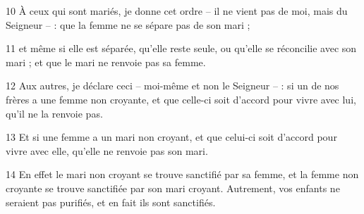 
10 À ceux qui sont mariés, je donne cet ordre – il ne vient pas de moi, mais du Seigneur – : que la femme ne se sépare pas de son mari ;

11 et même si elle est séparée, qu’elle reste seule, ou qu’elle se réconcilie avec son mari ; et que le mari ne renvoie pas sa femme.

12 Aux autres, je déclare ceci – moi-même et non le Seigneur – : si un de nos frères a une femme non croyante, et que celle-ci soit d’accord pour vivre avec lui, qu’il ne la renvoie pas.

13 Et si une femme a un mari non croyant, et que celui-ci soit d’accord pour vivre avec elle, qu’elle ne renvoie pas son mari.

14 En effet le mari non croyant se trouve sanctifié par sa femme, et la femme non croyante se trouve sanctifiée par son mari croyant. Autrement, vos enfants ne seraient pas purifiés, et en fait ils sont sanctifiés.